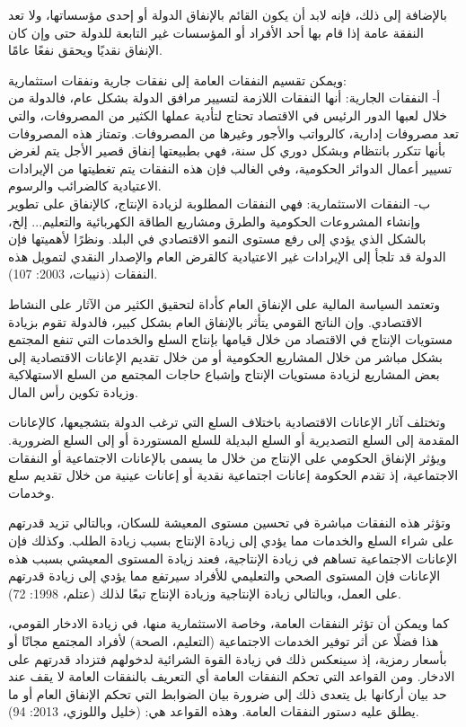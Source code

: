 \documentclass[10pt,a4paper]{report}
\begin{document}
\begin{doublespacing}
بالإضافة إلى ذلك، فإنه لابد أن يكون القائم بالإنفاق الدولة أو إحدى مؤسساتها، ولا تعد النفقة عامة إذا قام بها أحد الأفراد أو المؤسسات غير التابعة للدولة حتى وإن كان الإنفاق نقديًا ويحقق نفعًا عامًا. 

ويمكن تقسيم النفقات العامة إلى نفقات جارية ونفقات استثمارية:\\
أ- النفقات الجارية: أنها النفقات اللازمة لتسيير مرافق الدولة بشكل عام، فالدولة من خلال لعبها الدور الرئيس في الاقتصاد تحتاج لتأدية عملها الكثير من المصروفات، والتي تعد مصروفات إدارية، كالرواتب والأجور وغيرها من المصروفات. وتمتاز هذه المصروفات بأنها تتكرر بانتظام وبشكل دوري كل سنة، فهي بطبيعتها إنفاق قصير الأجل يتم لغرض تسيير أعمال الدوائر الحكومية، وفي الغالب فإن هذه النفقات يتم تغطيتها من الإيرادات الاعتيادية كالضرائب والرسوم.\\
ب- النفقات الاستثمارية: فهي النفقات المطلوبة لزيادة الإنتاج، كالإنفاق على تطوير وإنشاء المشروعات الحكومية والطرق ومشاريع الطاقة الكهربائية والتعليم... إلخ، بالشكل الذي يؤدي إلى رفع مستوى النمو الاقتصادي في البلد. ونظرًا لأهميتها فإن الدولة قد تلجأ إلى الإيرادات غير الاعتيادية كالقرض العام والإصدار النقدي لتمويل هذه النفقات (ذنيبات، 2003: 107).

وتعتمد السياسة المالية على الإنفاق العام كأداة لتحقيق الكثير من الآثار على النشاط الاقتصادي. وإن الناتج القومي يتأثر بالإنفاق العام بشكل كبير، فالدولة تقوم بزيادة مستويات الإنتاج في الاقتصاد من خلال قيامها بإنتاج السلع والخدمات التي تنفع المجتمع بشكل مباشر من خلال المشاريع الحكومية أو من خلال تقديم الإعانات الاقتصادية إلى بعض المشاريع لزيادة مستويات الإنتاج وإشباع حاجات المجتمع من السلع الاستهلاكية وزيادة تكوين رأس المال. 

وتختلف آثار الإعانات الاقتصادية باختلاف السلع التي ترغب الدولة بتشجيعها، كالإعانات المقدمة إلى السلع التصديرية أو السلع البديلة للسلع المستوردة أو إلى السلع الضرورية. ويؤثر الإنفاق الحكومي على الإنتاج من خلال ما يسمى بالإعانات الاجتماعية أو النفقات الاجتماعية، إذ تقدم الحكومة إعانات اجتماعية نقدية أو إعانات عينية من خلال تقديم سلع وخدمات. 

وتؤثر هذه النفقات مباشرة في تحسين مستوى المعيشة للسكان، وبالتالي تزيد قدرتهم على شراء السلع والخدمات مما يؤدي إلى زيادة الإنتاج بسبب زيادة الطلب. وكذلك فإن الإعانات الاجتماعية تساهم في زيادة الإنتاجية، فعند زيادة المستوى المعيشي بسبب هذه الإعانات فإن المستوى الصحي والتعليمي للأفراد سيرتفع مما يؤدي إلى زيادة قدرتهم على العمل، وبالتالي زيادة الإنتاجية وزيادة الإنتاج تبعًا لذلك (عتلم، 1998: 72). 

كما ويمكن أن تؤثر النفقات العامة، وخاصة الاستثمارية منها، في زيادة الادخار القومي، هذا فضلًا عن أثر توفير الخدمات الاجتماعية (التعليم، الصحة) لأفراد المجتمع مجانًا أو بأسعار رمزية، إذ سينعكس ذلك في زيادة القوة الشرائية لدخولهم فتزداد قدرتهم على الادخار. ومن القواعد التي تحكم النفقات العامة أي التعريف بالنفقات العامة لا يقف عند حد بيان أركانها بل يتعدى ذلك إلى ضرورة بيان الضوابط التي تحكم الإنفاق العام أو ما يطلق عليه دستور النفقات العامة. وهذه القواعد هي: (خليل واللوزي، 2013: 94).


\end{doublespacing}
\end{document}
